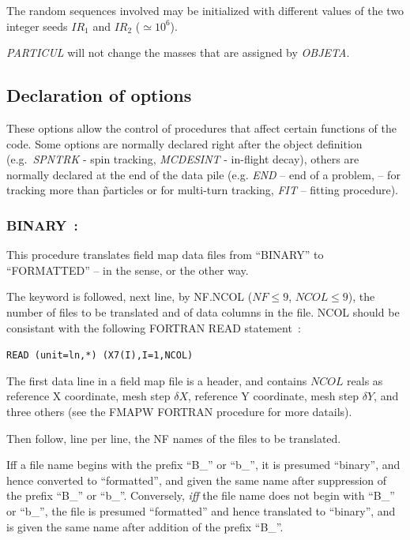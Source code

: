 \noindent The random sequences involved may be initialized with different
values of the 
two integer seeds $ IR_1 $ and $ IR_2 $ ($\simeq 10^6 $). 

\bigskip\noindent \textsl{PARTICUL} will not change the masses
that are assigned by \textsl{OBJETA}.

\newpage

\subsection{Declaration of options} \label{sec4.3}

These options allow the control of procedures that affect certain 
functions of the code. Some options are normally declared right after 
the object definition (e.g.~\textsl{SPNTRK} - spin tracking, 
\textsl{MCDESINT} -
in-flight decay),  others are normally declared at the end of the data pile (e.g. 
\textsl{END} -- end of a problem, 
\REBELOTE{} -- for tracking more than \imax\~particles  or for 
multi-turn tracking, 
\textsl{FIT} -- fitting procedure). 

\newpage

\subsubsection*{BINARY~: \BINARYTitl}  \label{BINARY} 
\medskip

This procedure translates field map data files from ``BINARY'' to 
``FORMATTED'' -- in the \FORTRAN sense, or the other way.
\bigskip

\noindent The keyword is followed, next line, by NF.NCOL ($NF\leq9$, $NCOL\leq9$), the number of files to be translated and 
of data columns in the file.  NCOL should be consistant with the following FORTRAN READ statement~: 

       {\tt     READ (unit=ln,*) (X7(I),I=1,NCOL)}

\noindent The first data line in a field map file is a header, 
and contains $NCOL$ reals as reference X coordinate, mesh step $\delta X$, 
reference Y coordinate, mesh step $\delta Y$, and three others (see the FMAPW FORTRAN procedure for 
more datails).
 
\noindent Then follow, line per line, the NF names of the files to be translated.
\medskip

\noindent Iff a file name begins with the prefix ``B\_'' or ``b\_'', it is 
presumed ``binary'', and hence converted to ``formatted'', and given 
the same name after suppression of the prefix ``B\_'' or ``b\_''. Conversely, 
{\it iff} the file name does not begin with ``B\_'' or ``b\_'', the file is 
presumed ``formatted'' and hence translated to ``binary'', and is 
given the same name after addition of the prefix ``B\_''.
\medskip

